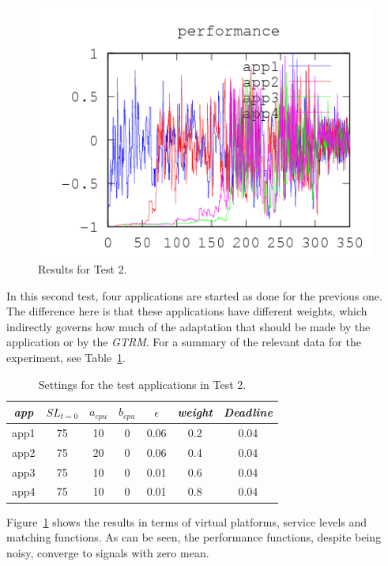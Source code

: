 \documentclass[nobiblatex]{LTHthesis}
\begin{document}
\begin{figure}[th]
\begin{minipage}{0.49\textwidth}
  \includegraphics[width=\textwidth]{"tools/plot/logs/test2/f"}
  \end{minipage}
\caption{Results for Test 2.}
\label{fig:test2}
\end{figure}

In this second test, four applications are started as done for the previous
one. The difference here is that these applications have different weights,
which indirectly governs how much of the adaptation that should be made by 
the application or by the \emph{GTRM}. 
For a summary of the relevant data for the experiment, see 
Table~\ref{tab:settings_test2}.

\begin{table}[h!]
  \centering
  \begin{tabular}{|c|c|c|c|c|c|c|}
 	\hline 
   \emph{app} & $SL_{t=0}$ & \textbf{$a_{cpu}$} & 
   \textbf{$b_{cpu}$} & \textbf{$\epsilon$} & \emph{weight} & 
   \emph{Deadline} \\ \hline
	app1 & 75 & 10 & 0 & 0.06 & 0.2 &0.04  \\ \hline
	app2 & 75 & 20 & 0 & 0.06 & 0.4 &0.04  \\ \hline
	app3 & 75 & 10 & 0 & 0.01 & 0.6 &0.04  \\ \hline
	app4 & 75 & 10 & 0 & 0.01 & 0.8 &0.04  \\ \hline        
  \end{tabular}
  \caption{Settings for the test applications in Test 2.}
  \label{tab:settings_test2}
\end{table}

Figure~\ref{fig:test2} shows the results in terms of virtual platforms,
service levels and matching functions. As can be seen, the performance
functions, despite being noisy, converge to signals with zero mean.
\end{document}
